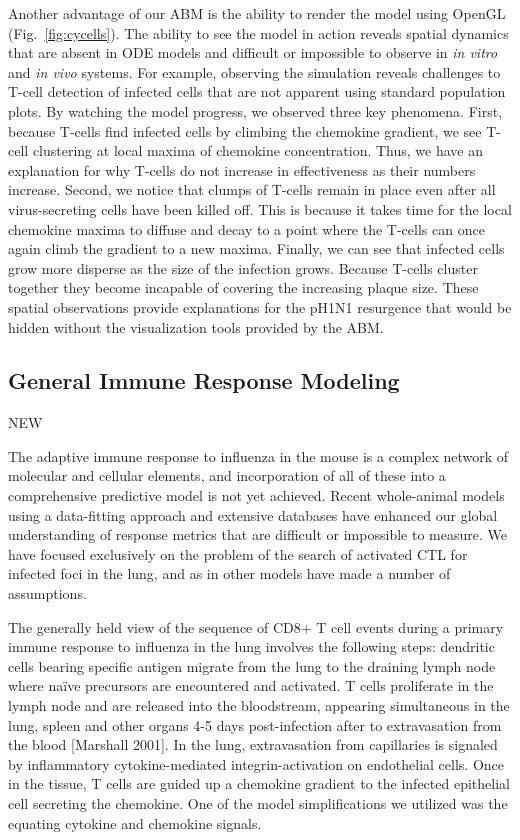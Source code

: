 \documentclass[10pt]{article}
\begin{document}
Another advantage of our ABM is the ability to render the model using OpenGL (Fig.~\ref{fig:cycells}).  The ability to see the model in action reveals spatial dynamics that are absent in ODE models and difficult or impossible to observe in \textit{in vitro} and \textit{in vivo} systems.  For example, observing the simulation reveals challenges to T-cell detection of infected cells that are not apparent using standard population plots.  By watching the model progress, we observed three key phenomena.  First, because T-cells find infected cells by climbing the chemokine gradient, we see T-cell clustering at local maxima of chemokine concentration.  Thus, we have an explanation for why T-cells do not increase in effectiveness as their numbers increase.  Second, we notice that clumps of T-cells remain in place even after all virus-secreting cells have been killed off.  This is because it takes time for the local chemokine maxima to diffuse and decay to a point where the T-cells can once again climb the gradient to a new maxima.  Finally, we can see that infected cells grow more disperse as the size of the infection grows.  Because T-cells cluster together they become incapable of covering the increasing plaque size.  These spatial observations provide explanations for the pH1N1 resurgence that would be hidden without the visualization tools provided by the ABM.

\subsection*{General Immune Response Modeling}

NEW

The adaptive immune response to influenza in the mouse is a complex network of molecular and cellular elements, and incorporation of all of these into a comprehensive predictive model is not yet achieved.  Recent whole-animal models using a data-fitting approach and extensive databases have enhanced our global understanding of response metrics that are difficult or impossible to measure.  We have focused exclusively on the problem of the search of activated CTL for infected foci in the lung, and as in other models have made a number of assumptions.

The generally held view of the sequence of CD8+ T cell events during a primary immune response to influenza in the lung involves the following steps: dendritic cells bearing specific antigen migrate from the lung to the draining lymph node where naïve precursors are encountered and activated.  T cells proliferate in the lymph node and are released into the bloodstream, appearing simultaneous in the lung, spleen and other organs 4-5 days post-infection after to extravasation from the blood [Marshall 2001].   In the lung, extravasation from capillaries is signaled by inflammatory cytokine-mediated integrin-activation on endothelial cells.  Once in the tissue, T cells are guided up a chemokine gradient to the infected epithelial cell secreting the chemokine.  One of the model simplifications we utilized was the equating cytokine and chemokine signals.
\end{document}
